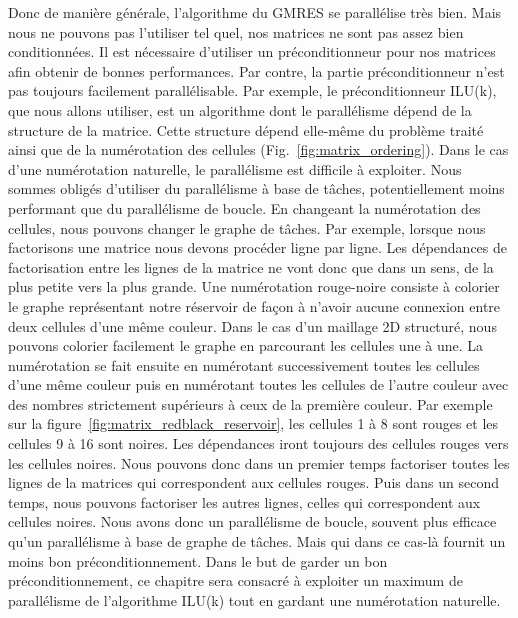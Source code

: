 Donc de manière générale, l'algorithme du GMRES se parallélise très bien.
%
Mais nous ne pouvons pas l'utiliser tel quel, nos matrices ne sont pas assez bien conditionnées.
%
Il est nécessaire d'utiliser un préconditionneur pour nos matrices afin obtenir de bonnes performances.
%
Par contre, la partie préconditionneur n'est pas toujours facilement parallélisable.
%
Par exemple, le préconditionneur ILU(k), que nous allons utiliser, est un algorithme dont le parallélisme dépend de la structure de la matrice.
%
Cette structure dépend elle-même du problème traité ainsi que de la numérotation des cellules (Fig.~\ref{fig:matrix_ordering}).
%
Dans le cas d'une numérotation naturelle, le parallélisme est difficile à exploiter.
%
Nous sommes obligés d'utiliser du parallélisme à base de tâches, potentiellement moins performant que du parallélisme de boucle.
%
En changeant la numérotation des cellules, nous pouvons changer le graphe de tâches.
%
Par exemple, lorsque nous factorisons une matrice nous devons procéder ligne par ligne.
%
Les dépendances de factorisation entre les lignes de la matrice ne vont donc que dans un sens, de la plus petite vers la plus grande.
%
Une numérotation rouge-noire consiste à colorier le graphe représentant notre réservoir de façon à n'avoir aucune connexion entre deux cellules d'une même couleur.
%
Dans le cas d'un maillage 2D structuré, nous pouvons colorier facilement le graphe en parcourant les cellules une à une.
%
La numérotation se fait ensuite en numérotant successivement toutes les cellules d'une même couleur puis en numérotant toutes les cellules de l'autre couleur avec des nombres strictement supérieurs à ceux de la première couleur.
%
Par exemple sur la figure~\ref{fig:matrix_redblack_reservoir}, les cellules 1 à 8 sont rouges et les cellules 9 à 16 sont noires.
%
Les dépendances iront toujours des cellules rouges vers les cellules noires.
%
Nous pouvons donc dans un premier temps factoriser toutes les lignes de la matrices qui correspondent aux cellules rouges.
%
Puis dans un second temps, nous pouvons factoriser les autres lignes, celles qui correspondent aux cellules noires.
%
Nous avons donc un parallélisme de boucle, souvent plus efficace qu'un parallélisme à base de graphe de tâches.
%
Mais qui dans ce cas-là fournit un moins bon préconditionnement\cite{red_black_ilu2}.
%
Dans le but de garder un bon préconditionnement, ce chapitre sera consacré à exploiter un maximum de parallélisme de l'algorithme ILU(k) tout en gardant une numérotation naturelle.

